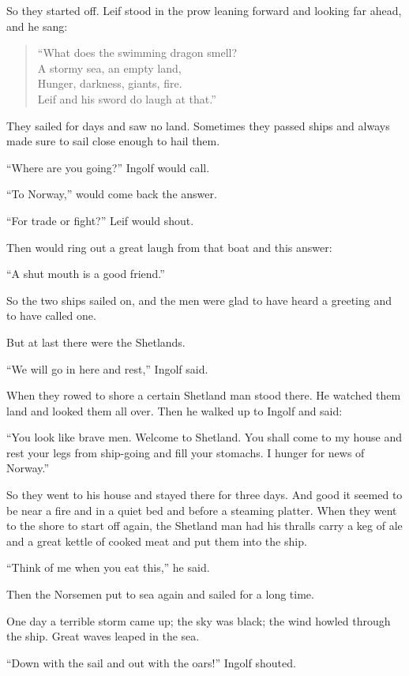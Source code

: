 So they started off. Leif stood in the prow leaning forward and looking
far ahead, and he sang:

\begin{quote}
``What does the swimming dragon smell?\\
A stormy sea, an empty land,\\
Hunger, darkness, giants, fire.\\
Leif and his sword do laugh at that.''
\end{quote}

They sailed for days and saw no land. Sometimes they passed ships and
always made sure to sail close enough to hail them.

``Where are you going?'' Ingolf would call.

``To Norway,'' would come back the answer.

``For trade or fight?'' Leif would shout.

Then would ring out a great laugh from that boat and this answer:

``A shut mouth is a good friend.''

So the two ships sailed on, and the men were glad to have heard a
greeting and to have called one.

But at last there were the Shetlands.

``We will go in here and rest,'' Ingolf said.

When they rowed to shore a certain Shetland man stood there. He watched
them land and looked them all over. Then he walked up to Ingolf and
said:

``You look like brave men. Welcome to Shetland. You shall come to my
house and rest your legs from ship-going and fill your stomachs. I
hunger for news of Norway.''

So they went to his house and stayed there for three days. And good it
seemed to be near a fire and in a quiet bed and before a steaming
platter. When they went to the shore to start off again, the Shetland
man had his thralls carry a keg of ale and a great kettle of cooked meat
and put them into the ship.

``Think of me when you eat this,'' he said.

Then the Norsemen put to sea again and sailed for a long time.

One day a terrible storm came up; the sky was black; the wind howled
through the ship. Great waves leaped in the sea.

``Down with the sail and out with the oars!'' Ingolf shouted.

